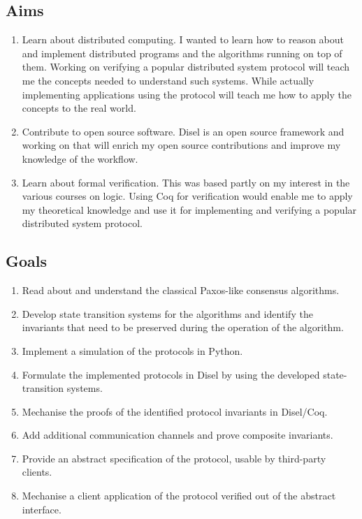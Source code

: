 \subsection{Aims}
\begin{enumerate}
\itemsep0em
  \item Learn about distributed computing. I wanted to learn how to reason about
    and implement distributed programs and the algorithms running on top of them.
    Working on verifying a popular distributed system protocol will teach me
    the concepts needed to understand such systems. While actually implementing
    applications using the protocol will teach me how to apply the concepts to
    the real world.
  \item Contribute to open source software. Disel is an open source framework
    and working on that will enrich my open source contributions and improve
    my knowledge of the workflow.
  \item Learn about formal verification. This was based partly on my interest in
    the various courses on logic. Using Coq for verification would enable me
    to apply my theoretical knowledge and use it for
    implementing and verifying a popular distributed system protocol.

\end{enumerate}

\vspace{-5mm}
\subsection{Goals}
\begin{enumerate}
\itemsep0em
  \item Read about and understand the classical Paxos-like consensus algorithms.
  \item Develop state transition systems for the algorithms and identify the invariants that need to be preserved during the operation of the algorithm.
  \item Implement a simulation of the protocols in Python.
  \item Formulate the implemented protocols in Disel by using the developed state-transition systems.
  \item Mechanise the proofs of the identified protocol invariants in Disel/Coq.
  \item Add additional communication channels and prove composite invariants.
  \item Provide an abstract specification of the protocol, usable by third-party clients.
  \item Mechanise a client application of the protocol verified out of the abstract interface.
\end{enumerate}

